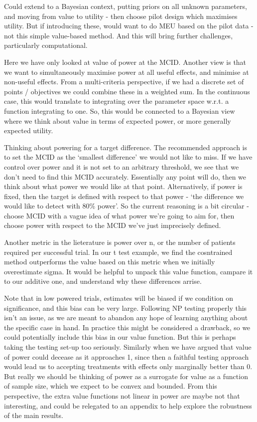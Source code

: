 \documentclass[sagev, Crown]{sagej}
\begin{document}
Could extend to a Bayesian context, putting priors on all unknown parameters, and moving from value to utility - then choose pilot design which maximises utility. But if introducing these, would want to do MEU based on the pilot data - not this simple value-based method. And this will bring further challenges, particularly computational.

Here we have only looked at value of power at the MCID. Another view is that we want to simultaneously maximise power at all useful effects, and minimise at non-useful effects. From a multi-criteria perspective, if we had a discrete set of points / objectives we could combine these in a weighted sum. In the continuous case, this would translate to integrating over the parameter space w.r.t. a function integrating to one. So, this would be connected to a Bayesian view where we think about value in terms of expected power, or more generally expected utility. 

Thinking about powering for a target difference. The recommended approach is to set the MCID as the `smallest difference' we would not like to miss. If we have control over power and it is not set to an arbitrary threshold, we see that we don't need to find this MCID accurately. Essentially any point will do, then we think about what power we would like at that point. Alternatively, if power is fixed, then the target is defined with respect to that power - `the difference we would like to detect with 80\% power'. So the current reasoning is a bit circular - choose MCID with a vague idea of what power we're going to aim for, then choose power with respect to the MCID we've just imprecisely defined.

Another metric in the lieterature is power over n, or the number of patients required per successful trial. In our t test example, we find the cosntrained method outperforms the value based on this metric when we initially overestimate sigma. It would be helpful to unpack this value function, campare it to our additive one, and understand why these differences arrise.

Note that in low powered trials, estimates will be biased if we condition on significance, and this bias can be very large. Following NP testing properly this isn't an issue, as we are meant to abandon any hope of learning anything about the specific case in hand. In practice this might be considered a drawback, so we could potentially include this bias in our value function. But this is perhaps taking the testing set-up too seriously. Similarly when we have argued that value of power could decease as it approaches 1, since then a faithful testing approach would lead us to accepting treatments with effects only marginally better than 0. But really we should be thinking of power as a surrogate for value as a function of sample size, which we expect to be convex and bounded. From this perspective, the extra value functions not linear in power are maybe not that interesting, and could be relegated to an appendix to help explore the robustness of the main results.
\end{document}
